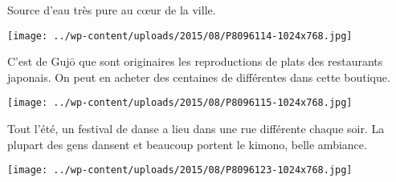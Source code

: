  Source d'eau très pure au c\oe{}ur de la ville. 
\begin{center} \texttt{[image: ../wp-content/uploads/2015/08/P8096114-1024x768.jpg]} \end{center}
\vspace{-\topsep}
\pagebreak

 C'est de Gujō que sont originaires les reproductions de plats des restaurants japonais. On peut en acheter des centaines de différentes dans cette boutique. 
\begin{center} \texttt{[image: ../wp-content/uploads/2015/08/P8096115-1024x768.jpg]} \end{center}

 Tout l'été, un festival de danse a lieu dans une rue différente chaque soir. La plupart des gens dansent et beaucoup portent le kimono, belle ambiance. 
\begin{center} \texttt{[image: ../wp-content/uploads/2015/08/P8096123-1024x768.jpg]} \end{center}
\vspace{-\topsep}